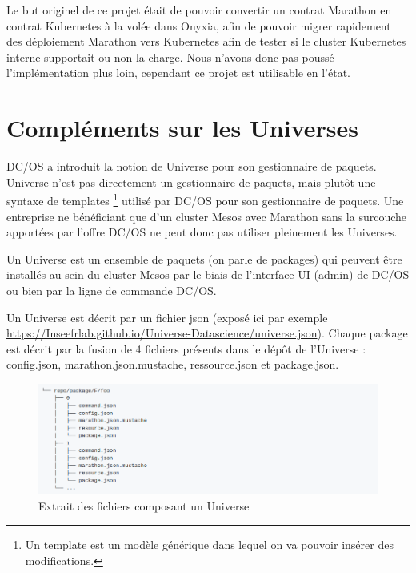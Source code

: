 \documentclass[11pt,fleqn]{book} %
\begin{document}
Le but originel de ce projet était de pouvoir convertir un contrat Marathon en contrat Kubernetes à la volée dans Onyxia, afin de pouvoir migrer rapidement des déploiement Marathon vers Kubernetes afin de tester si le cluster Kubernetes interne supportait ou non la charge. Nous n'avons donc pas poussé l'implémentation plus loin, cependant ce projet est utilisable en l'état.




\chapter{Compléments sur les Universes}
\label{Universe}
\vspace{-2cm}
DC/OS a introduit la notion de Universe pour son gestionnaire de paquets. Universe n'est pas directement un gestionnaire de paquets, mais plutôt une syntaxe de templates \footnote{Un template est un modèle générique dans lequel on va pouvoir insérer des modifications.} utilisé par DC/OS pour son gestionnaire de paquets. Une entreprise ne bénéficiant que d'un cluster Mesos avec Marathon sans la surcouche apportées par l'offre DC/OS ne peut donc pas utiliser pleinement les Universes. \newline

Un Universe est un ensemble de paquets (on parle de packages) qui peuvent être installés au sein du cluster Mesos par le biais de l'interface UI (admin) de DC/OS ou bien par la ligne de commande DC/OS.\newline


Un Universe est décrit par un fichier json (exposé ici par exemple \url{https://Inseefrlab.github.io/Universe-Datascience/universe.json}). Chaque package  est décrit par la fusion de 4 fichiers présents dans le dépôt de l'Universe : config.json, marathon.json.mustache, ressource.json et package.json.

\begin{figure}[H]\centering
\renewcommand{\figurename}{Capture d'écran}
\includegraphics[scale=0.5,trim={0 0 20cm 0},clip ]{Pictures/Comparaison/deployer/universe/universe-repo.png}
\captionsetup{margin=1.5cm,format=hang,justification=justified}
\caption[]{Extrait des fichiers composant un Universe \newline}
\end{figure}
\end{document}
